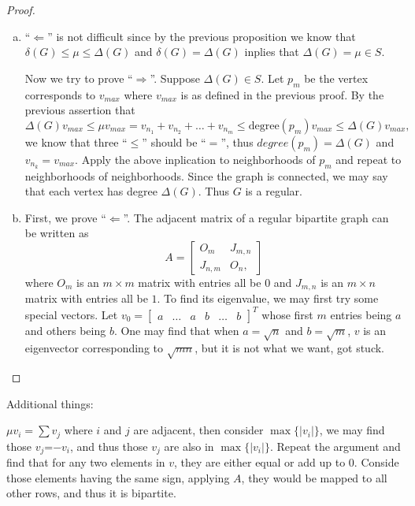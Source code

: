 \documentclass{article}
\begin{document}
\begin{proof}
    \begin{enumerate}[(a)]
        \item ``$\Leftarrow$'' is not difficult since by the previous proposition we know that $\delta(G)\leq\mu\leq\Delta(G)$ and $\delta(G)=\Delta(G)$ inplies that $\Delta(G)=\mu\in S$. 
        
        Now we try to prove ``$\Rightarrow$''. Suppose $\Delta(G)\in S$. Let $p_m$ be the vertex corresponds to $v_{max}$ where $v_{max}$ is as defined in the previous proof. By the previous assertion that 
        \begin{equation*}
            \Delta(G)v_{max}\leq\mu v_{max}=v_{n_1}+v_{n_2}+\ldots+v_{n_m}\leq\mathrm{degree}(p_m)v_{max}\leq\Delta(G)v_{max},
        \end{equation*}
        we know that three ``$\leq$'' should be ``$=$'', thus $degree(p_m)=\Delta(G)$ and $v_{n_k}=v_{max}$. Apply the above inplication to neighborhoods of $p_m$ and repeat to neighborhoods of neighborhoods. Since the graph is connected, we may say that each vertex has degree $\Delta(G)$. Thus $G$ is a regular.

        \item First, we prove ``$\Leftarrow$''. The adjacent matrix of a regular bipartite graph can be written as
        \begin{equation*}
            A=\begin{bmatrix}
                O_m & J_{m,n} \\ J_{n,m} & O_n,
            \end{bmatrix}
        \end{equation*}
        where $O_m$ is an $m\times m$ matrix with entries all be $0$ and $J_{m,n}$ is an $m\times n$ matrix with entries all be $1$. To find its eigenvalue, we may first try some special vectors. Let $v_0=\begin{bmatrix}
            a & \ldots & a & b & \ldots & b
        \end{bmatrix}^T$ whose first $m$ entries being $a$ and others being $b$. One may find that when $a=\sqrt{n}$ and $b=\sqrt{m}$, $v$ is an eigenvector corresponding to $\sqrt{mn}$, but it is not what we want, got stuck.
    \end{enumerate}
\end{proof}

Additional things:

$\mu v_i=\sum v_j$ where $i$ and $j$ are adjacent, then consider $\max\{\vert v_i\vert\}$, we may find those $v_j$=$-v_i$, and thus those $v_j$ are also in $\max\{\vert v_i\vert\}$. Repeat the argument and find that for any two elements in $v$, they are either equal or add up to $0$. Conside those elements having the same sign, applying $A$, they would be mapped to all other rows, and thus it is bipartite.
\end{document}
